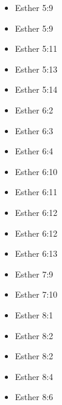 \documentclass[14pt]{book}
\begin{document}
\begin{multicols}{2}
\begin{itemize}
							\item Esther 5:9
							
							\item Esther 5:9
							
							\item Esther 5:11
							
							\item Esther 5:13
							
							\item Esther 5:14
							
							\item Esther 6:2
							
							\item Esther 6:3
							
							\item Esther 6:4
							
							\item Esther 6:10
							
							\item Esther 6:11
							
							\item Esther 6:12
							
							\item Esther 6:12
							
							\item Esther 6:13
							
							\item Esther 7:9
							
							\item Esther 7:10
							
							\item Esther 8:1
							
							\item Esther 8:2
							
							\item Esther 8:2
							
							\item Esther 8:4
							
							\item Esther 8:6
							

\end{itemize}
\end{multicols}
\end{document}
